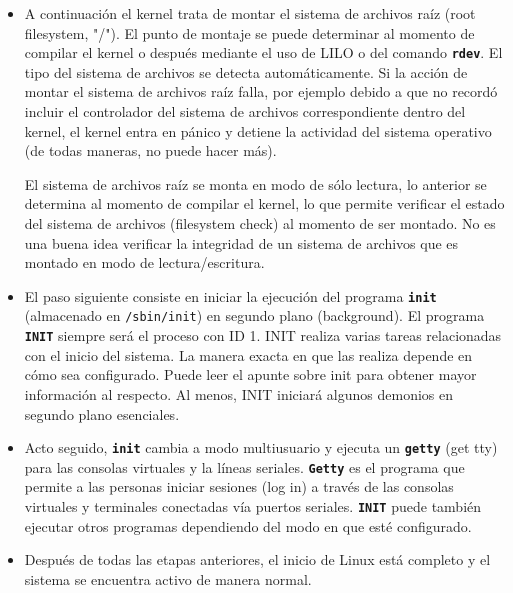 \documentclass[12pt]{article}
\begin{document}
\begin{itemize}
	\item{
A continuación el kernel trata de montar el sistema de archivos raíz (root
filesystem, "/"). El punto de montaje se puede determinar al momento de compilar
el kernel o después mediante el uso de LILO o del comando
\texttt{\textbf{rdev}}. El tipo del sistema de archivos se detecta
automáticamente. Si la acción de montar el sistema de archivos raíz falla, por
ejemplo debido a que no recordó incluir el controlador del sistema de archivos
correspondiente dentro del kernel, el kernel entra en pánico y detiene la
actividad del sistema operativo (de todas maneras, no puede hacer más).  

 El sistema de archivos raíz se monta en modo de sólo lectura, lo anterior
se determina al momento de compilar el kernel, lo que permite verificar el
estado del sistema de archivos (filesystem check) al momento de ser montado. No
es una buena idea verificar la integridad de un sistema de archivos que es
montado en modo de lectura/escritura.  }

	\item{ El paso siguiente consiste en iniciar la  ejecución del
	programa \texttt{\textbf{init}} (almacenado en
	\texttt{/sbin/init}) en segundo plano (background). El
	programa \texttt{\textbf{INIT}} siempre será el proceso con ID 1. INIT
	realiza varias tareas relacionadas con el inicio del sistema. La manera
	exacta en que las realiza depende en cómo sea configurado. Puede leer el
	apunte sobre init para obtener mayor información al respecto. Al
	menos, INIT iniciará algunos demonios en segundo plano esenciales.
	}

	\item{ Acto seguido, \texttt{\textbf{init}} cambia a modo
	multiusuario y ejecuta un \texttt{\textbf{getty}} (get tty) para las
	consolas virtuales y la líneas seriales. \texttt{\textbf{Getty}} es el
	programa  que permite a las personas iniciar sesiones (log in) a través
	de las consolas virtuales y terminales conectadas vía puertos seriales.
	\texttt{\textbf{INIT}} puede también ejecutar otros programas
	dependiendo del modo en que esté configurado.  }

	\item{

Después de todas las etapas anteriores, el inicio de Linux está completo y el
sistema se encuentra activo de manera normal.  }

	\end{itemize} 
\end{document}
